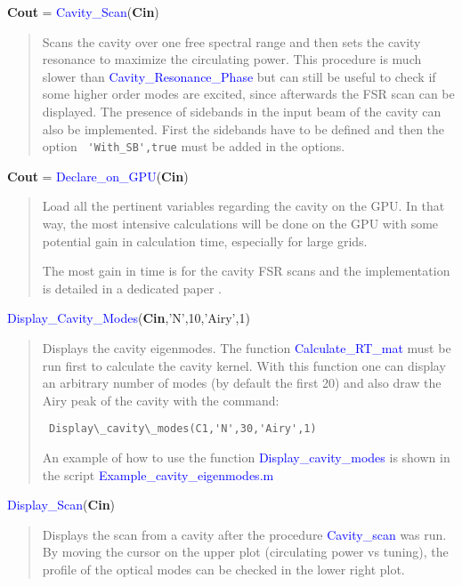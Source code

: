 \noindent \textbf{Cout} = \textcolor{blue}{Cavity\_Scan}(\textbf{Cin})
\vspace*{-0.2cm}
\begin{quote}
Scans the cavity over one free spectral range and then sets the cavity resonance to maximize the circulating power. This procedure is much slower than \textcolor{blue}{Cavity\_Resonance\_Phase} but can still be useful to check if some higher order modes are excited, since afterwards the FSR scan can be displayed.
The presence of sidebands in the input beam of the cavity can also be implemented. First the sidebands have to be defined and then the option \verb? 'With_SB',true? must be added in the options.


\end{quote}

\noindent \textbf{Cout} = \textcolor{blue}{Declare\_on\_GPU}(\textbf{Cin})
\vspace*{-0.2cm}
\begin{quote}
Load all the pertinent variables regarding the cavity on the GPU. In that way, the most intensive calculations will be done on the GPU with some potential gain in calculation time, especially for large grids.

The most gain in time is for the cavity FSR scans and the implementation is detailed in a dedicated paper \cite{Nils_GPU}.

\end{quote}


\noindent \textcolor{blue}{Display\_Cavity\_Modes}(\textbf{Cin},'N',10,'Airy',1)
\vspace*{-0.2cm}
\begin{quote}
Displays the cavity eigenmodes. The function \textcolor{blue}{Calculate\_RT\_mat} must be run first to calculate the cavity kernel. With this function one can display an arbitrary number of modes (by default the first 20) and also draw the Airy peak of the cavity with the command:

  \verb? Display\_cavity\_modes(C1,'N',30,'Airy',1) ?

An example of how to use the function \textcolor{blue}{Display\_cavity\_modes} is shown in the script \textcolor{blue}{Example\_cavity\_eigenmodes.m}
\end{quote}

\noindent \textcolor{blue}{Display\_Scan}(\textbf{Cin})
\vspace*{-0.2cm}
\begin{quote}
Displays the scan from a cavity after the procedure \textcolor{blue}{Cavity\_scan} was run. By moving the cursor on the upper plot (circulating power vs tuning), the profile of the optical modes can be checked in the lower right plot.
\end{quote}

